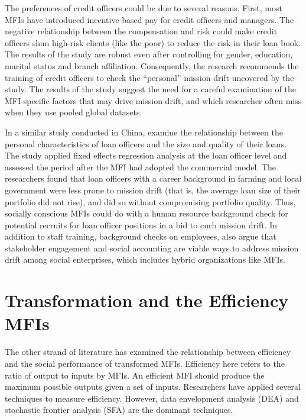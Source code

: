 \documentclass[a4paper, nobind]{templates/ociamthesis}
\begin{document}
The preferences of credit officers could be due to several reasons. First, most MFIs have introduced incentive-based pay for credit officers and managers. The negative relationship between the compensation and risk could make credit officers shun high-risk clients (like the poor) to reduce the risk in their loan book. The results of the study are robust even after controlling for gender, education, marital status and branch affiliation. Consequently, the research recommends the training of credit officers to check the ``personal'' mission drift uncovered by the study. The results of the study suggest the need for a careful examination of the MFI-specific factors that may drive mission drift, and which researcher often miss when they use pooled global datasets.

In a similar study conducted in China, \textcite{jia2016commercialization} examine the relationship between the personal characteristics of loan officers and the size and quality of their loans. The study applied fixed effects regression analysis at the loan officer level and assessed the period after the MFI had adopted the commercial model. The researchers found that loan officers with a career background in farming and local government were less prone to mission drift (that is, the average loan size of their portfolio did not rise), and did so without compromising portfolio quality. Thus, socially conscious MFIs could do with a human resource background check for potential recruits for loan officer positions in a bid to curb mission drift. In addition to staff training, background checks on employees, \textcite{ramus2017stakeholders} also argue that stakeholder engagement and social accounting are viable ways to address mission drift among social enterprises, which includes hybrid organizations like MFIs.

\hypertarget{transformation-and-the-efficiency-mfis}{%
\section{Transformation and the Efficiency MFIs}\label{transformation-and-the-efficiency-mfis}}

\noindent The other strand of literature has examined the relationship between efficiency and the social performance of transformed MFIs. Efficiency here refers to the ratio of output to inputs by MFIs. An efficient MFI should produce the maximum possible outputs given a set of inputs. Researchers have applied several techniques to measure efficiency. However, data envelopment analysis (DEA) and stochastic frontier analysis (SFA) are the dominant techniques.
\end{document}
